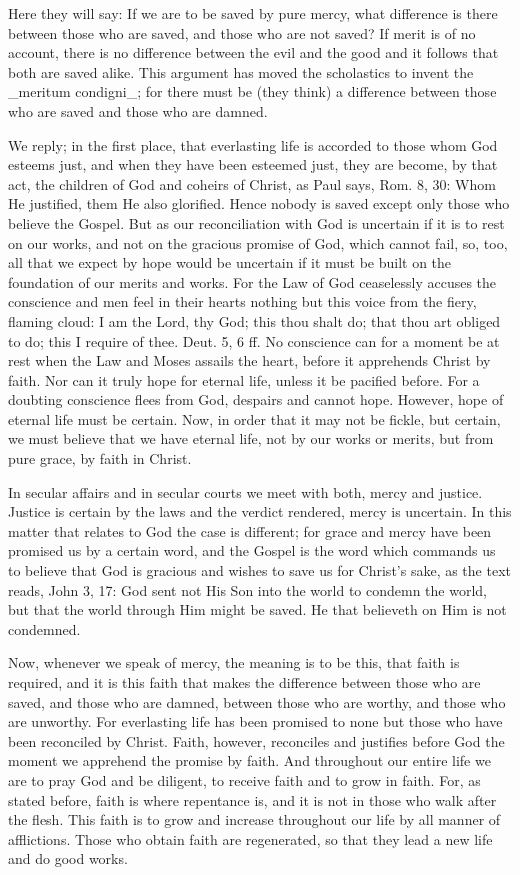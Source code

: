 Here they will say: If we are to be saved by pure mercy, what
difference is there between those who are saved, and those who are
not saved?  If merit is of no account, there is no difference between
the evil and the good and it follows that both are saved alike.  This
argument has moved the scholastics to invent the _meritum condigni_;
for there must be (they think) a difference between those who are
saved and those who are damned.

We reply; in the first place, that everlasting life is accorded to
those whom God esteems just, and when they have been esteemed just,
they are become, by that act, the children of God and coheirs of
Christ, as Paul says, Rom. 8, 30: Whom He justified, them He also
glorified.  Hence nobody is saved except only those who believe the
Gospel.  But as our reconciliation with God is uncertain if it is to
rest on our works, and not on the gracious promise of God, which
cannot fail, so, too, all that we expect by hope would be uncertain
if it must be built on the foundation of our merits and works.  For
the Law of God ceaselessly accuses the conscience and men feel in
their hearts nothing but this voice from the fiery, flaming cloud: I
am the Lord, thy God; this thou shalt do; that thou art obliged to do;
this I require of thee.  Deut. 5, 6 ff.  No conscience can for a
moment be at rest when the Law and Moses assails the heart, before it
apprehends Christ by faith.  Nor can it truly hope for eternal life,
unless it be pacified before.  For a doubting conscience flees from
God, despairs and cannot hope.  However, hope of eternal life must be
certain.  Now, in order that it may not be fickle, but certain, we
must believe that we have eternal life, not by our works or merits,
but from pure grace, by faith in Christ.

In secular affairs and in secular courts we meet with both, mercy and
justice.  Justice is certain by the laws and the verdict rendered,
mercy is uncertain.  In this matter that relates to God the case is
different; for grace and mercy have been promised us by a certain
word, and the Gospel is the word which commands us to believe that
God is gracious and wishes to save us for Christ's sake, as the text
reads, John 3, 17: God sent not His Son into the world to condemn the
world, but that the world through Him might be saved.  He that
believeth on Him is not condemned.

Now, whenever we speak of mercy, the meaning is to be this, that
faith is required, and it is this faith that makes the difference
between those who are saved, and those who are damned, between those
who are worthy, and those who are unworthy.  For everlasting life has
been promised to none but those who have been reconciled by Christ.
Faith, however, reconciles and justifies before God the moment we
apprehend the promise by faith.  And throughout our entire life we
are to pray God and be diligent, to receive faith and to grow in
faith.  For, as stated before, faith is where repentance is, and it
is not in those who walk after the flesh.  This faith is to grow and
increase throughout our life by all manner of afflictions.  Those who
obtain faith are regenerated, so that they lead a new life and do
good works.

